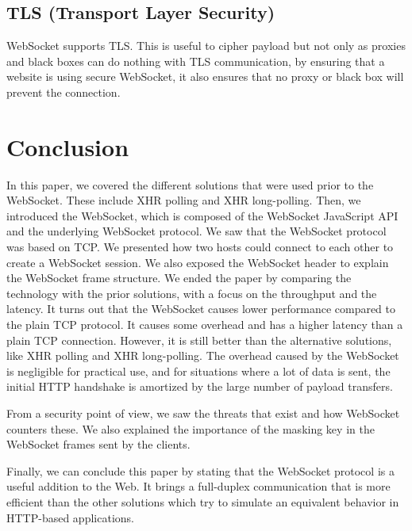 \documentclass[10pt,journal,compsoc]{IEEEtran}
\newcommand{\ws}{WebSocket}
\begin{document}
\subsection{TLS (Transport Layer Security)}
\ws{} supports TLS.
This is useful to cipher payload but not only as proxies and black boxes can do nothing with TLS communication, by ensuring that a website is using secure \ws{}, it also ensures that no proxy or black box will prevent the connection.


\section{Conclusion}
In this paper, we covered the different solutions that were used prior to the \ws{}.
These include XHR polling and XHR long-polling.
Then, we introduced the \ws{}, which is composed of the \ws{} JavaScript API and the underlying \ws{} protocol. %
We saw that the \ws{} protocol was based on TCP.
We presented how two hosts could connect to each other to create a \ws{} session.
We also exposed the \ws{} header to explain the \ws{} frame structure. %
We ended the paper by comparing the technology with the prior solutions, with a focus on the throughput and the latency.
It turns out that the \ws{} causes lower performance compared to the plain TCP protocol.
It causes some overhead and has a higher latency than a plain TCP connection.
However, it is still better than the alternative solutions, like XHR polling and XHR long-polling. %
The overhead caused by the \ws{} is negligible for practical use, and for situations where a lot of data is sent, the initial HTTP handshake is amortized by the large number of payload transfers. %

From a security point of view, we saw the threats that exist and how \ws{} counters these.
We also explained the importance of the masking key in the \ws{} frames sent by the clients. %

Finally, we can conclude this paper by stating that the \ws{} protocol is a useful addition to the Web.
It brings a full-duplex communication that is more efficient than the other solutions which try to simulate an equivalent behavior in HTTP-based applications.

\ifCLASSOPTIONcaptionsoff
  \newpage
\fi




\end{document}
